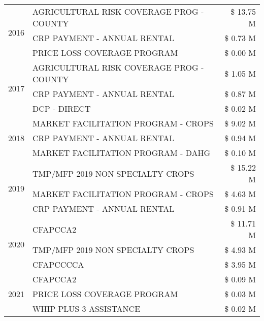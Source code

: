\begin{tabular}{llr}
\cline{1-3}
\multirow[t]{3}{*}{2016} & AGRICULTURAL RISK COVERAGE PROG - COUNTY      & \$ 13.75 M \\
 & CRP PAYMENT - ANNUAL RENTAL                   & \$ 0.73 M \\
 & PRICE LOSS COVERAGE PROGRAM                   & \$ 0.00 M \\
\cline{1-3}
\multirow[t]{3}{*}{2017} & AGRICULTURAL RISK COVERAGE PROG - COUNTY & \$ 1.05 M \\
 & CRP PAYMENT - ANNUAL RENTAL & \$ 0.87 M \\
 & DCP - DIRECT & \$ 0.02 M \\
\cline{1-3}
\multirow[t]{3}{*}{2018} & MARKET FACILITATION PROGRAM - CROPS & \$ 9.02 M \\
 & CRP PAYMENT - ANNUAL RENTAL & \$ 0.94 M \\
 & MARKET FACILITATION PROGRAM - DAHG & \$ 0.10 M \\
\cline{1-3}
\multirow[t]{3}{*}{2019} & TMP/MFP 2019 NON SPECIALTY CROPS & \$ 15.22 M \\
 & MARKET FACILITATION PROGRAM - CROPS & \$ 4.63 M \\
 & CRP PAYMENT - ANNUAL RENTAL & \$ 0.91 M \\
\cline{1-3}
\multirow[t]{3}{*}{2020} & CFAPCCA2 & \$ 11.71 M \\
 & TMP/MFP 2019 NON SPECIALTY CROPS & \$ 4.93 M \\
 & CFAPCCCCA & \$ 3.95 M \\
\cline{1-3}
\multirow[t]{3}{*}{2021} & CFAPCCA2 & \$ 0.09 M \\
 & PRICE LOSS COVERAGE PROGRAM & \$ 0.03 M \\
 & WHIP PLUS 3 ASSISTANCE & \$ 0.02 M \\
\cline{1-3}
\bottomrule
\end{tabular}
